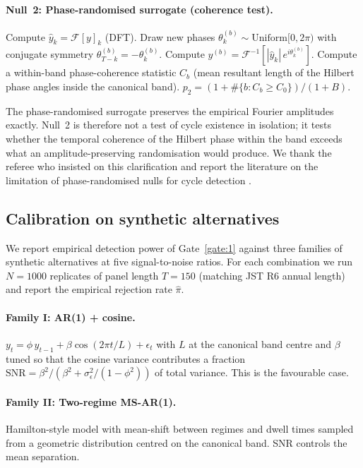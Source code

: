 \paragraph{Null~2: Phase-randomised surrogate (coherence test).}
\begin{algorithmic}[1]
\State Compute \(\hat y_k = \mathcal{F}[y]_k\) (DFT).
  \State Draw new phases \(\theta^{(b)}_k\sim\mathrm{Uniform}[0,2\pi)\)
         with conjugate symmetry
         \(\theta^{(b)}_{T-k}=-\theta^{(b)}_k\).
  \State Compute \(y^{(b)} = \mathcal{F}^{-1}[|\hat y_k|\,e^{i\theta^{(b)}_k}]\).
  \State Compute a within-band phase-coherence statistic
         \(C_b\) (mean resultant length of the Hilbert phase
         angles inside the canonical band).
\EndFor
\State \(p_2 = (1+\#\{b: C_b\geq C_0\})/(1+B)\).
\end{algorithmic}
The phase-randomised surrogate preserves the empirical Fourier
amplitudes exactly. Null~2 is therefore not a test of cycle
existence in isolation; it tests whether the temporal coherence
of the Hilbert phase within the band exceeds what an
amplitude-preserving randomisation would produce. We thank the
referee who insisted on this clarification and report the
literature on the limitation of phase-randomised nulls for cycle
detection \citep{schreiber_schmitz2000}.

\subsection{Calibration on synthetic alternatives}
\label{sec:calibration}

We report empirical detection power of Gate~\ref{gate:1} against
three families of synthetic alternatives at five signal-to-noise
ratios. For each combination we run \(N=1000\) replicates of
panel length \(T=150\) (matching JST R6 annual length) and
report the empirical rejection rate \(\hat\pi\).

\paragraph{Family I: AR(1) + cosine.}
\(y_t = \phi\,y_{t-1} + \beta\cos(2\pi t/L) + \epsilon_t\) with
\(L\) at the canonical band centre and \(\beta\) tuned so that
the cosine variance contributes a fraction
\(\mathrm{SNR}=\beta^2/(\beta^2+\sigma^2_\epsilon/(1-\phi^2))\)
of total variance. This is the favourable case.

\paragraph{Family II: Two-regime MS-AR(1).}
Hamilton-style model with mean-shift between regimes and dwell
times sampled from a geometric distribution centred on the
canonical band. SNR controls the mean separation.

